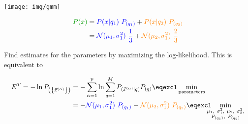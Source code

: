 \begin{frame} 

\pause

\begin{center}
	\texttt{[image: img/gmm]}
	\label{fig:gmmexample}
\end{center}

\pause


\svspace{-11mm}

\begin{align}
{\color{darkgreen}P(x)} &= {\color{blue}P(x|q_1)~P_{(q_1)}} + {\color{orange}P(x|q_2)~P_{(q_2)}}\\
&= {\color{blue}\mathcal{N}(\mu_1, \sigma^2_1)~\frac{1}{3}} + {\color{orange}\mathcal{N}(\mu_2, \sigma^2_1)~\frac{2}{3}}
\end{align}

\pause

Find estimates for the parameters by maximizing the log-likelihood. This is equivalent to

\svspace{-7mm}

\begin{align}
E^T = - \ln P_{\left( \left\{ \vec{x}^{(\alpha)} \right\} \right)} &= - \sum_{\alpha=1}^{p} \ln \sum_{q=1}^{M} P_{(\vec{x}^{(\alpha)} | q)} P_{(q)} \eqexcl \min_{\text{parameters}}\\
&= - {\color{blue}\mathcal{N}(\mu_1, \sigma^2_1)~P_{(q_1)}} - {\color{orange}\mathcal{N}(\mu_2, \sigma^2_1)~P_{(q_2)}}
\eqexcl
\kern-2ex
\min_{\substack{
\mu_1,~\sigma^2_1,~\mu_2,~\sigma^2_2,\\ P_{(q_1)},~P_{(q_2)}}}
\end{align}

\end{frame}

